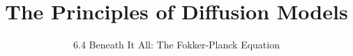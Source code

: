 ﻿%

\graphicspath{{../images/}}
\title{The Principles of Diffusion Models}
\subtitle{6.4 Beneath It All: The Fokker-Planck Equation}


\begin{frame}
    \titlepage
\end{frame}



